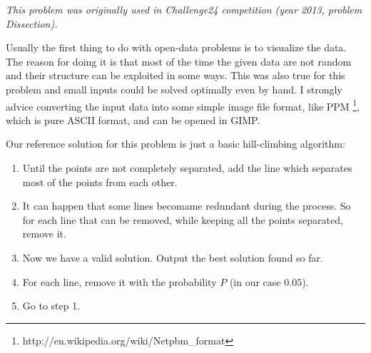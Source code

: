 


\textit{This problem was originally used in Challenge24 competition (year 2013, problem Dissection).}

Usually the first thing to do with open-data problems is to visualize the data.
The reason for doing it is that most of the time the given data are not random
and their structure can be exploited in some ways. This was also true for this
problem and small inputs could be solved optimally even by hand.
I strongly advice converting the input data into some simple image file format,
like PPM \footnote{http://en.wikipedia.org/wiki/Netpbm_format}, which is pure
ASCII format, and can be opened in GIMP.

Our reference solution for this problem is just a basic hill-climbing algorithm:
\begin{enumerate}
\item Until the points are not completely separated, add the line which separates most
of the points from each other.
\item It can happen that some lines becomame redundant during the process. So for each
line that can be removed, while keeping all the points separated, remove it.
\item Now we have a valid solution. Output the best solution found so far.
\item For each line, remove it with the probability $P$ (in our case $0.05$).
\item Go to step 1.
\end{enumerate}
